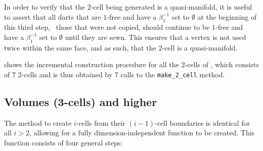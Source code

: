 \begin{enumerate}
In order to verify that the 2-cell being generated is a quasi-manifold, it is useful to assert that all darts that are $1$-free and have a $\beta_1^{-1}$ set to $\emptyset$ at the beginning of this third step, \ie\ those that were not copied, should continue to be $1$-free and have a $\beta_1^{-1}$ set to $\emptyset$ until they are sewn.
This ensures that a vertex is not used twice within the same face, and as such, that the 2-cell is a quasi-manifold.

\end{enumerate}

 shows the incremental construction procedure for all the 2-cells of , which consists of 7 2-cells and is thus obtained by 7 calls to the \texttt{make\_2\_cell} method.

\subsection{Volumes (3-cells) and higher}
\label{ss:incremental-volumes}

The method to create $i$-cells from their $(i-1)$-cell boundaries is identical for all $i > 2$, allowing for a fully dimension-independent function to be created.
This function consists of four general steps:

